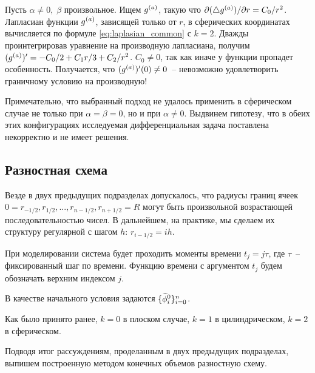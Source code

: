 Пусть $\alpha \neq 0, \; \beta$ произвольное. Ищем ${g^{(a)}}$, такую что $\partial (\triangle {g^{(a)}}) / \partial r = C_0 / r^2$. Лапласиан функции ${g^{(a)}}$, зависящей только от $r$, в сферических координатах вычисляется по формуле \eqref{eq:laplasian_common} с $k = 2$. Дважды проинтегрировав уравнение на производную лапласиана, получим $({g^{(a)}})' = -C_0 / 2 + C_1 r / 3 + C_2 / r^2$. $C_0 \neq 0$, так как иначе у функции пропадет особенность. Получается, что $(\ga)'(0) \hm \neq 0$~-- невозможно удовлетворить граничному условию на производную!

Примечательно, что выбранный подход не удалось применить в сферическом случае не только при $\alpha = \beta = 0$, но и при $\alpha \neq 0$. Выдвинем гипотезу, что в обеих этих конфигурациях исследуемая дифференциальная задача поставлена некорректно и не имеет решения.


\subsection{Разностная схема}

Везде в двух предыдущих подразделах допускалось, что радиусы границ ячеек $0 = r_{-1/2}, r_{1/2}, ..., r_{n - 1/2}, r_{n + 1/2} = R$ могут быть произвольной возрастающей последовательностью чисел. В дальнейшем, на практике, мы сделаем их структуру регулярной с шагом $h$: $r_{i - 1/2} = ih$.

При моделировании система будет проходить моменты времени $t_j = j \tau$, где $\tau$~-- фиксированный шаг по времени. Функцию времени с аргументом $t_j$ будем обозначать верхним индексом $j$.

В качестве начального условия задаются $\{ {\widetilde{\phi}}_i^0 \}_{i = 0}^n$.

Как было принято ранее, $k = 0$ в плоском случае, $k = 1$ в цилиндрическом, $k = 2$ в сферическом.

Подводя итог рассуждениям, проделанным в двух предыдущих подразделах, выпишем построенную методом конечных объемов разностную схему.

